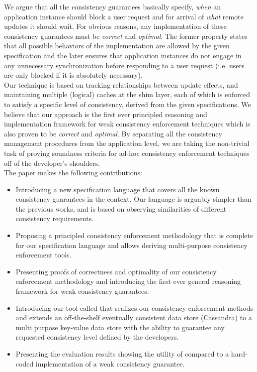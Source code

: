 We argue that all the consistency guarantees basically specify, \emph{when} an 
application instance should block a user request and for arrival of 
\emph{what} remote updates it should wait. For obvious reasons, any implementation of these 
consistency guarantees must be \emph{correct} and \emph{optimal}. The former property states that 
all possible behaviors of the implementation are allowed by the given specification and the later 
ensures that application instances do not engage in 
any unnecessary synchronization before responding to a user request (i.e. users are only blocked if 
it is absolutely necessary).
\\ Our technique is based on tracking relationships between update effects, and maintaining multiple 
(logical) caches at the shim layer, each of which is enforced to satisfy a specific level of consistency, 
derived from the given specifications. We believe that our approach is the first ever principled 
reasoning and implementation framework for weak consistency enforcement techniques which 
is also proven to be \emph{correct} and \emph{optimal}. 
By separating all the consistency management procedures from the application level, we are taking 
the non-trivial task of proving soundness criteria for ad-hoc consistency enforcement techniques 
off of the developer's shoulders. 
\\The paper makes the following contributions:
\begin{itemize}
\item Introducing a new specification language that covers all the known consistency guarantees in 
the context. Our language is arguably simpler than the previous works, and is based on observing 
similarities of different consistency requirements.

\item Proposing a principled consistency enforcement methodology that is 
complete for our specification language and allows deriving multi-purpose consistency enforcement 
tools.

\item Presenting proofs of correctness and optimality of our consistency enforcement methodology 
and introducing the first ever general reasoning framework for weak consistency guarantees. 

\item Introducing our tool called  \tool that realizes our consistency enforcement methods and 
extends an off-the-shelf eventually consistent data store (Cassandra) to a multi purpose key-value 
data store with the ability to guarantee any requested consistency level defined by the 
developers. 

\item Presenting the evaluation results showing the utility of \tool compared to a hard-coded
implementation of a weak consistency guarantee. 
\end{itemize}

